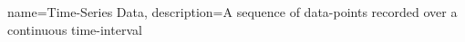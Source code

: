  {
  name=Time-Series Data, description={A sequence of data-points recorded over a
  continuous time-interval}
}
